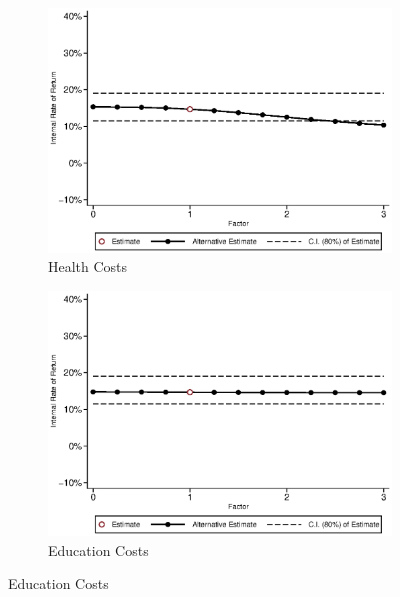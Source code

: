 \begin{figure}[H]
\ContinuedFloat		
	\begin{subfigure}[h]{0.8\textwidth}
	\centering
	\caption{Health Costs} \label{fig:irrf_health_m1}
	\includegraphics[width=\textwidth]{AppOutput/Sensitivity/irrf_health_m1.eps}
	\end{subfigure}
	
	\begin{subfigure}[h]{0.8\textwidth}
	\centering
	\caption{Education Costs} \label{fig:irrf_edu_m1}
	\includegraphics[width=\textwidth]{AppOutput/Sensitivity/irrf_edu_m1.eps}
	\end{subfigure}
\end{figure}
	
